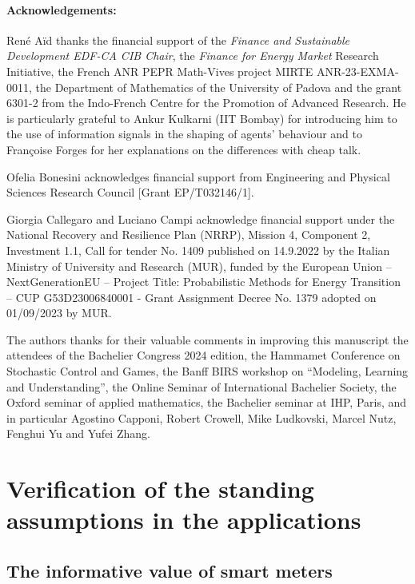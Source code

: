\documentclass[a4paper,10pt]{article}
\theoremstyle{definition}
\theoremstyle{plain}
\numberwithin{equation}{section}
\begin{document}
\paragraph{Acknowledgements:} 
René Aïd thanks the financial support of the {\em Finance and Sustainable Development EDF-CA CIB Chair}, the {\em Finance for Energy Market} Research Initiative, the French ANR PEPR Math-Vives project MIRTE ANR-23-EXMA-0011, the Department of Mathematics of the University of Padova and the grant 6301-2 from the Indo-French Centre for the Promotion of Advanced Research. He is particularly grateful to Ankur Kulkarni (IIT Bombay) for introducing him to the use of information signals in the shaping of agents' behaviour and to Françoise Forges for her explanations on the differences with cheap talk.\smallskip

Ofelia Bonesini acknowledges financial support from Engineering and Physical Sciences Research
Council [Grant EP/T032146/1].\smallskip

Giorgia Callegaro and Luciano Campi acknowledge financial support under the National Recovery and Resilience Plan (NRRP), Mission 4, Component 2, Investment 1.1, Call for tender No. 1409 published on 14.9.2022 by the Italian Ministry of University and Research (MUR), funded by the European Union – NextGenerationEU – Project Title: Probabilistic Methods for Energy Transition -- CUP G53D23006840001 - Grant Assignment Decree No. 1379 adopted on 01/09/2023 by MUR. \smallskip

The authors thanks for their valuable comments in improving this manuscript the attendees of the Bachelier Congress 2024 edition, the Hammamet Conference on Stochastic Control and Games, the Banff BIRS workshop on ``Modeling, Learning and Understanding'', the Online Seminar of International Bachelier Society, the Oxford seminar of applied mathematics, the Bachelier seminar at IHP, Paris, and in particular Agostino Capponi, Robert Crowell, Mike Ludkovski, Marcel Nutz, Fenghui Yu and Yufei Zhang.

\appendix

\section{Verification of the standing assumptions in the applications}

\subsection{The informative value of smart meters}\label{app_ex_1}
\end{document}
